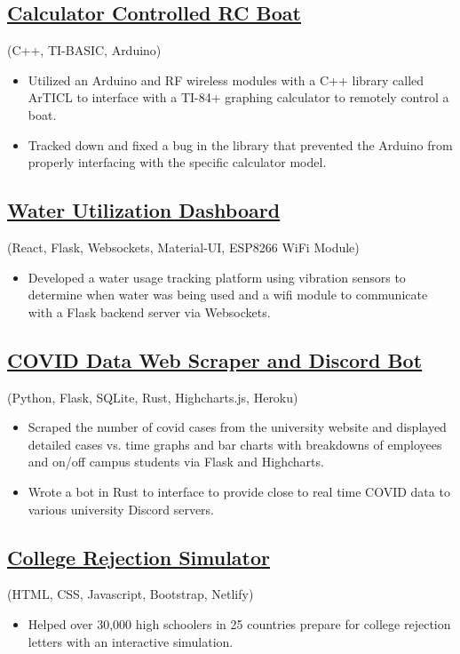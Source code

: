 \documentclass{article}
\begin{document}
\subsection{\href{https://github.com/jshin313/CalcControlledBoat}{\underline{Calculator Controlled RC Boat}}} \hfill (C++, TI-BASIC, Arduino)
\begin{itemize}
    \item Utilized an Arduino and RF wireless modules with a C++ library called ArTICL to interface with a TI-84+ graphing calculator to remotely control a boat.
    \item Tracked down and fixed a bug in the library that prevented the Arduino from properly interfacing with the specific calculator model.
\end{itemize}

\subsection{\href{https://github.com/jshin313/AquaQuant}{\underline{Water Utilization Dashboard}}} \hfill (React, Flask, Websockets, Material-UI, ESP8266 WiFi Module)
\begin{itemize}
    \item Developed a water usage tracking platform using vibration sensors to determine when water was being used and a wifi module to communicate with a Flask backend server via Websockets. 
\end{itemize}

\subsection{\href{https://github.com/jshin313/unofficial-temple-covid-live-dashboard}{\underline{COVID Data Web Scraper and Discord Bot}}} \hfill (Python, Flask, SQLite, Rust, Highcharts.js, Heroku)
\begin{itemize}
    \item Scraped the number of covid cases from the university website and displayed detailed cases vs. time graphs and bar charts with breakdowns of employees and on/off campus students via Flask and Highcharts.
    \item Wrote a bot in Rust to interface to provide close to real time COVID data to various university Discord servers.
\end{itemize}

\subsection{\href{https://ivyhub.org/decision-letters/}{\underline{College Rejection Simulator}}} \hfill (HTML, CSS, Javascript, Bootstrap, Netlify)
\begin{itemize}
    \item Helped over 30,000 high schoolers in 25 countries prepare for college rejection letters with an interactive simulation.
\end{itemize}
\end{document}
